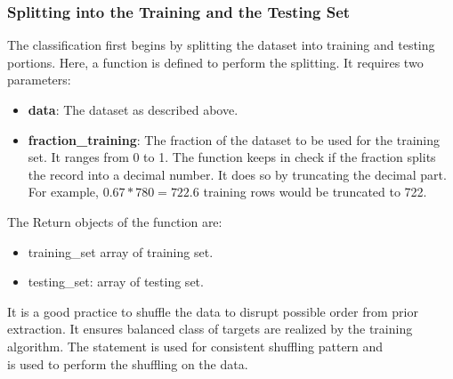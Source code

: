 \subsubsection{Splitting into the Training and the Testing Set}
The classification first begins by splitting the dataset into training and testing portions. Here, a function is defined to perform the splitting. It requires two parameters:
\begin{itemize}
	\item \textbf{data}: The  dataset as described above.
	\item \textbf{fraction\_training}: The fraction of the dataset to be used for the training set. It ranges from 0 to 1. The function  keeps in check if the fraction splits the record into a decimal number. It does so by truncating the decimal part. For example, $0.67*780=722.6$ training rows would be truncated to 722.
\end{itemize}

The Return objects of the function are:
\begin{itemize}
	\item training\_set  array of training set.
	\item testing\_set:  array of testing set.
\end{itemize}
It is a good practice to shuffle the data to disrupt possible order from prior extraction. It ensures balanced class of targets are realized by the training algorithm. The statement  is used for consistent shuffling pattern and\\  is used to perform the shuffling on the data.

